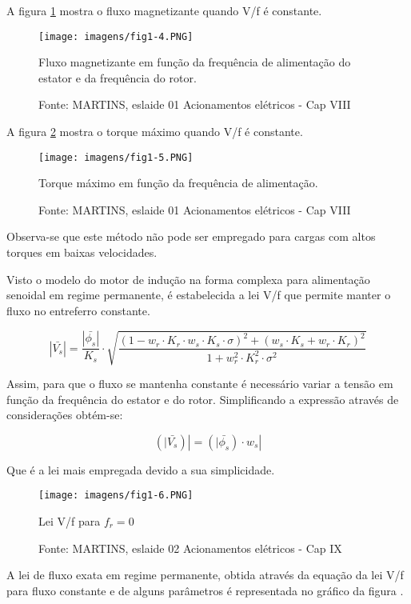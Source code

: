 A figura \ref{fig:fig1.4} mostra o fluxo magnetizante quando V/f é constante.

\begin{figure}[ht!]
\center
\texttt{[image: imagens/fig1-4.PNG]}
\caption{\label{fig:fig1.4}Fluxo magnetizante em função da frequência de alimentação do estator e da frequência do rotor.}
\caption*{Fonte: MARTINS, eslaide 01 Acionamentos elétricos - Cap VIII}
\end{figure}

A figura \ref{fig:fig1.5} mostra o torque máximo quando V/f é constante.

\begin{figure}[ht!]
\center
\texttt{[image: imagens/fig1-5.PNG]}
\caption{\label{fig:fig1.5}Torque máximo em função da frequência de alimentação.}
\caption*{Fonte: MARTINS, eslaide 01 Acionamentos elétricos - Cap VIII}
\end{figure}

Observa-se que este método não pode ser empregado para cargas com altos torques em baixas velocidades.

Visto o modelo do motor de indução na forma complexa para alimentação senoidal em regime permanente, é estabelecida a lei V/f que permite manter o fluxo no entreferro constante.

\[\left | \bar{V_{s}} \right | = \frac{\left | \bar{\phi _{s}} \right | }{K_{s}}\cdot \sqrt{\frac{\left ( 1-w_{r}\cdot K_{r}\cdot w_{s}\cdot K_{s} \cdot \sigma\right )^2+\left ( w_{s}\cdot K_{s}+ w_{r}\cdot K_{r} \right )^2}{1+w_{r}^2\cdot K_{r}^2\cdot \sigma ^2}}\]

Assim, para que o fluxo se mantenha constante é necessário variar a tensão em função da frequência do estator e do rotor.
Simplificando a expressão através de considerações obtém-se:

\[\left( | \bar{V_{s}} \right) | = \left( | \bar{\phi _{s}} \right) \cdot w_{s}|\]

Que é a lei mais empregada devido a sua simplicidade.

\begin{figure}[ht!]
\center
\texttt{[image: imagens/fig1-6.PNG]}
\caption{\label{fig:fig1.6}Lei V/f para $f_{r}=0$}
\caption*{Fonte: MARTINS, eslaide 02 Acionamentos elétricos - Cap IX}
\end{figure}

A lei de fluxo exata em regime permanente, obtida através da equação da lei V/f para fluxo constante e de alguns parâmetros é representada no gráfico da figura \label{fig:fig1.7}.

